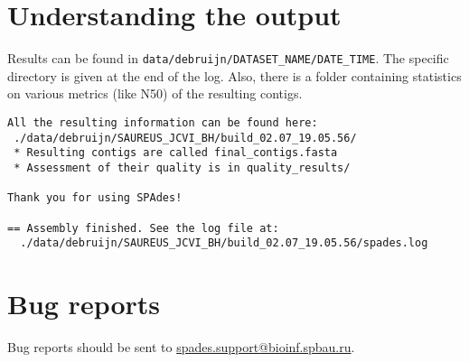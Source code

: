 \documentclass{article}
\def\spades{SPAdes}
\def\ecoli{\it E.~coli}
\begin{document}
\section{Understanding the output}
Results can be found in {\tt data/debruijn/DATASET\_NAME/DATE\_TIME}.
The specific directory is given at the end of the log.
Also, there is a folder containing statistics on various metrics (like N50) of the resulting contigs.
\begin{lstlisting}
All the resulting information can be found here: 
 ./data/debruijn/SAUREUS_JCVI_BH/build_02.07_19.05.56/
 * Resulting contigs are called final_contigs.fasta
 * Assessment of their quality is in quality_results/

Thank you for using SPAdes!

== Assembly finished. See the log file at: 
  ./data/debruijn/SAUREUS_JCVI_BH/build_02.07_19.05.56/spades.log
\end{lstlisting}



\section{Bug reports}
Bug reports should be sent to \url{spades.support@bioinf.spbau.ru}.






\end{document}
